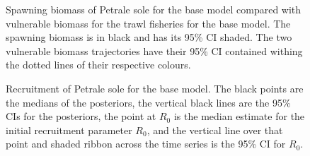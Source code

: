 \documentclass[11pt]{book}
\begin{document}
\begin{figure}[H]

{\centering {} 

}

\caption{Spawning biomass of Petrale sole for the base model compared with vulnerable biomass for the trawl fisheries for the base model. The spawning biomass is in black and has its 95\% CI shaded. The two vulnerable biomass trajectories have their 95\% CI contained withing the dotted lines of their respective colours.}\label{fig:fig-base-sb-vuln-compare}
\end{figure}



\begin{figure}[H]

{\centering {} 

}

\caption{Recruitment of Petrale sole for the base model. The black points are the medians of the posteriors, the vertical black lines are the 95\% CIs for the posteriors, the point at \(R_0\) is the median estimate for the initial recruitment parameter \(R_0\), and the vertical line over that point and shaded ribbon across the time series is the 95\% CI for \(R_0\).}\label{fig:fig-base-recr}
\end{figure}
\end{document}
